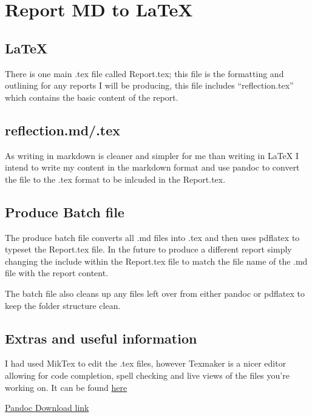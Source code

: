 \section{Report MD to LaTeX}\label{report-md-to-latex}

\subsection{LaTeX}\label{latex}

There is one main .tex file called Report.tex; this file is the
formatting and outlining for any reports I will be producing, this file
includes ``reflection.tex'' which contains the basic content of the
report.

\subsection{reflection.md/.tex}\label{reflection.md.tex}

As writing in markdown is cleaner and simpler for me than writing in
LaTeX I intend to write my content in the markdown format and use pandoc
to convert the file to the .tex format to be inlcuded in the Report.tex.

\subsection{Produce Batch file}\label{produce-batch-file}

The produce batch file converts all .md files into .tex and then uses
pdflatex to typeset the Report.tex file. In the future to produce a
different report simply changing the include within the Report.tex file
to match the file name of the .md file with the report content.

The batch file also cleans up any files left over from either pandoc or
pdflatex to keep the folder structure clean.

\subsection{Extras and useful
information}\label{extras-and-useful-information}

I had used MikTex to edit the .tex files, however Texmaker is a nicer
editor allowing for code completion, spell checking and live views of
the files you're working on. It can be found
\href{http://www.xm1math.net/texmaker/}{here}

\href{http://pandoc.org/installing.html}{Pandoc Download link}

